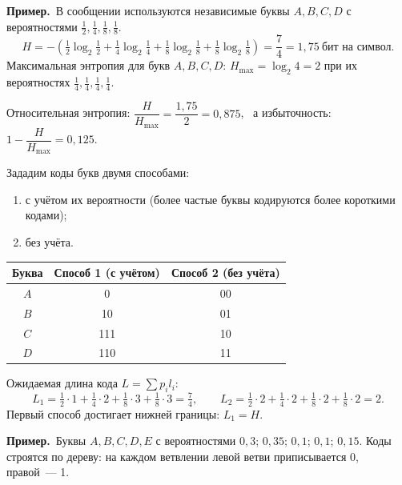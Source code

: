 \documentclass[a4paper,11pt]{article}
\newcommand{\prim}{\textbf{Пример.}\ }
\begin{document}
\prim В сообщении используются независимые буквы $A, B, C, D$ с вероятностями
$\frac12, \frac14, \frac18, \frac18$.
\[
  H = -\left(\tfrac12 \log_2 \tfrac12 + \tfrac14 \log_2 \tfrac14 + \tfrac18 \log_2 \tfrac18 + \tfrac18 \log_2 \tfrac18\right)
    = \frac74 = 1{,}75 \ \text{бит на символ}.
\]
Максимальная энтропия для букв $A, B, C, D$: $H_{\max} = \log_2 4 = 2$ при их вероятностях
$\frac14, \frac14, \frac14, \frac14$.

Относительная энтропия: $\dfrac{H}{H_{\max}} = \dfrac{1{,}75}{2} = 0{,}875$, \ а избыточность:
$1 - \dfrac{H}{H_{\max}} = 0{,}125$.

Зададим коды букв двумя способами:
\begin{enumerate}[label=\arabic*)]
  \item с учётом их вероятности (более частые буквы кодируются более короткими кодами);
  \item без учёта.
\end{enumerate}

\begin{center}
\renewcommand{\arraystretch}{1.2}
\begin{tabular}{c|c|c}
  Буква & Способ 1 (с учётом) & Способ 2 (без учёта) \\ \hline
  $A$ & 0   & 00 \\
  $B$ & 10  & 01 \\
  $C$ & 111 & 10 \\
  $D$ & 110 & 11 \\
\end{tabular}
\end{center}
Ожидаемая длина кода $L = \sum p_i l_i$:
\[
  L_1 = \tfrac12 \cdot 1 + \tfrac14 \cdot 2 + \tfrac18 \cdot 3 + \tfrac18 \cdot 3 = \tfrac74, \qquad
  L_2 = \tfrac12 \cdot 2 + \tfrac14 \cdot 2 + \tfrac18 \cdot 2 + \tfrac18 \cdot 2 = 2.
\]
Первый способ достигает нижней границы: $L_1 = H$.

\prim Буквы $A, B, C, D, E$ с вероятностями $0{,}3$; $0{,}35$; $0{,}1$; $0{,}1$; $0{,}15$.
Коды строятся по дереву: на каждом ветвлении левой ветви приписывается 0, правой~--- 1.
\end{document}
